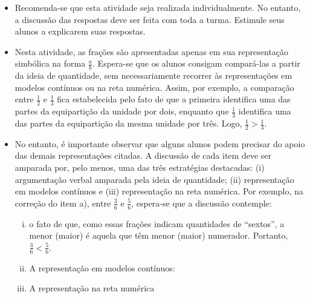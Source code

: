 \begin{multicols}{2}
   \begin{itemize}
   \item   Recomenda-se que esta atividade seja realizada individualmente. No entanto, a discussão das respostas deve ser feita com toda a turma. Estimule seus alunos a explicarem suas respostas.
   \item Nesta atividade, as frações são apresentadas apenas em sua representação simbólica na forma $\frac{a}{b}$. Espera-se que os alunos consigam compará-las a partir da ideia de quantidade, sem necessariamente recorrer às representações em modelos contínuos ou na reta numérica. Assim, por exemplo, a comparação entre $\frac{1}{2}$ e $\frac{1}{3}$ fica estabelecida pelo fato de que a primeira identifica uma das partes da equipartição da unidade por dois, enquanto que $\frac{1}{3}$ identifica uma das partes da equipartição da mesma unidade por três. Logo, $\frac{1}{2} > \frac{1}{3}$. 
   \item No entanto, é importante observar que alguns alunos podem precisar do apoio das demais representações citadas. A discussão de cada item deve ser amparada por, pelo menos, uma das três estratégias destacadas: (i) argumentação verbal amparada pela ideia de quantidade; (ii) representação em modelos contínuos e (iii) representação na reta numérica. Por exemplo, na correção do item a), entre $\frac{3}{6}$ e $\frac{5}{6}$, espera-se que a discussão contemple:
   \begin{enumerate}[(i)]
    \item o fato de que, como essas frações indicam quantidades de ``sextos'', a menor (maior) é aquela que têm menor (maior) numerador. Portanto, $\frac{3}{6}< \frac{5}{6}$. 
    \item A representação em modelos contínuos: 
    \item A representação na reta numérica %
    \end{enumerate}
   

\end{itemize}
\end{multicols}
